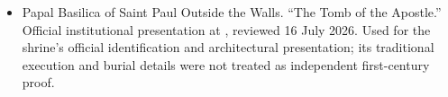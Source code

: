 \begin{itemize}
\item Papal Basilica of Saint Paul Outside the Walls. ``The Tomb of the
  Apostle.'' Official institutional presentation at
  ,
  reviewed 16 July 2026. Used for the shrine's official identification and
  architectural presentation; its traditional execution and burial details
  were not treated as independent first-century proof.
\end{itemize}
